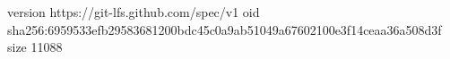 version https://git-lfs.github.com/spec/v1
oid sha256:6959533efb29583681200bdc45c0a9ab51049a67602100e3f14ceaa36a508d3f
size 11088
